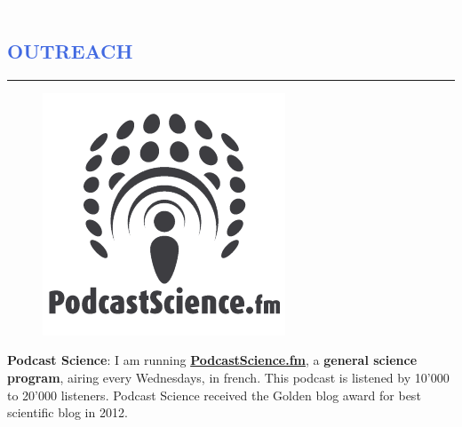 \documentclass[12pt]{article}
\begin{document}

\newpage
\textcolor{White}{.}
\vspace{-1.5cm}
\textcolor{RoyalBlue}{\section{\large OUTREACH}
\vspace{-0.35cm}\hrule}
\vspace{0.5cm}
\begin{figure}
\vspace{-0.95cm}
\begin{mybox}
    \includegraphics[width=1.\textwidth]{figures_CV/PodcastScience.png}
 \end{mybox}
\vspace{-1.1cm}
\end{figure}
\textbf{Podcast Science}: I am running \href{http://www.podcastscience.fm}
{\textbf{PodcastScience.fm}}, a \textbf{general science program}, airing every
Wednesdays, in french. This podcast is listened by 10'000 to 20'000
listeners. Podcast Science received the Golden blog award for
best scientific blog in 2012.
\end{document}
